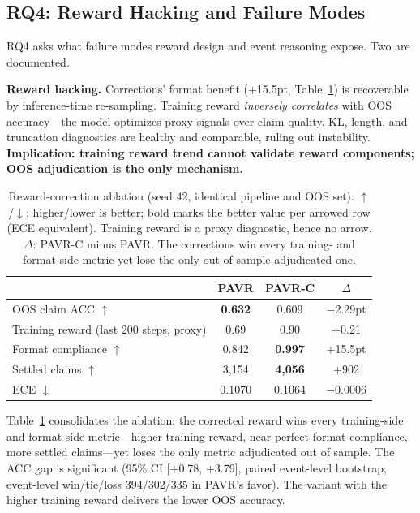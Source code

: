 \documentclass[sigconf, anonymous, review]{acmart}
\begin{document}
\subsection{RQ4: Reward Hacking and Failure Modes}
\label{sec:cases}

RQ4 asks what failure modes reward design and event reasoning expose. Two are documented.

\textbf{Reward hacking.} Corrections' format benefit (+15.5pt, Table~\ref{tab:ablation}) is recoverable by inference-time re-sampling. Training reward \emph{inversely correlates} with OOS accuracy---the model optimizes proxy signals over claim quality. KL, length, and truncation diagnostics are healthy and comparable, ruling out instability. \textbf{Implication: training reward trend cannot validate reward components; OOS adjudication is the only mechanism.}

\begin{table}[t]
\centering\small
\caption{Reward-correction ablation (seed 42, identical pipeline and OOS set). $\uparrow$/$\downarrow$: higher/lower is better; bold marks the better value per arrowed row (ECE equivalent). Training reward is a proxy diagnostic, hence no arrow. $\Delta$: PAVR-C minus PAVR. The corrections win every training- and format-side metric yet lose the only out-of-sample-adjudicated one.}
\label{tab:ablation}
\setlength{\tabcolsep}{5pt}
\begin{tabular}{@{}lccc@{}}
\toprule
 & PAVR & PAVR-C & $\Delta$ \\
\midrule
OOS claim ACC $\uparrow$ & \textbf{0.632} & 0.609 & $-$2.29pt \\
Training reward (last 200 steps, proxy) & 0.69 & 0.90 & +0.21 \\
Format compliance $\uparrow$ & 0.842 & \textbf{0.997} & +15.5pt \\
Settled claims $\uparrow$ & 3,154 & \textbf{4,056} & +902 \\
ECE $\downarrow$ & 0.1070 & 0.1064 & $-$0.0006 \\
\bottomrule
\end{tabular}
\end{table}

Table~\ref{tab:ablation} consolidates the ablation: the corrected reward wins every training-side and format-side metric---higher training reward, near-perfect format compliance, more settled claims---yet loses the only metric adjudicated out of sample. The ACC gap is significant (95\% CI [+0.78, +3.79], paired event-level bootstrap; event-level win/tie/loss 394/302/335 in PAVR's favor). The variant with the higher training reward delivers the lower OOS accuracy.
\end{document}
